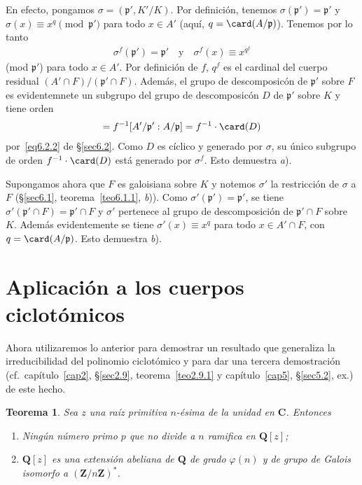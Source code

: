 \documentclass[bibtotoc,leqno,spanish]{amsbook}
\newcommand{\QQ}{\mathbf{Q}}
\newcommand{\ZZ}{\mathbf{Z}}
\newcommand{\CC}{\mathbf{C}}
\newcommand{\idl}[1]{\mathfrak{#1}}
\numberwithin{equation}{section}
\theoremstyle{note}
\theoremstyle{note}
\newtheorem{theorem}{Teorema}
\theoremstyle{rem}
\numberwithin{theorem}{section}
\numberwithin{proposition}{section}
\numberwithin{definition}{section}
\numberwithin{lemma}{section}
\numberwithin{corollary}{section}
\numberwithin{example}{section}
\numberwithin{footnote}{section}%
\begin{document}
En efecto, pongamos $\sigma = (\idl{p}',K'/K)$. Por definici\'on, tenemos $\sigma(\idl{p}')=\idl{p}'$ y
$\sigma(x) \equiv x^{q}\pmod{\idl{p}'}$ para todo $x\in A'$ (aqu\'i, $q = \card(A/\idl{p})$). Tenemos por lo tanto
\begin{gather*}
\sigma^{f}(\idl{p}') = \idl{p}'\quad\text{y}\quad\sigma^{f}(x)\equiv x^{q^{f}}
\end{gather*}
(mod $\idl{p}'$) para todo $x\in A'$. Por definici\'on de $f$, $q^{f}$ es el cardinal del cuerpo residual
$(A'\cap F)/(\idl{p}'\cap F)$. Adem\'as, el grupo de descomposic\'on de $\idl{p}'$ sobre $F$
es evidentemnete un subgrupo del grupo de descomposic\'on $D$ de $\idl{p}'$ sobre $K$ y tiene orden
\begin{gather*}
[A'/\idl{p}':(A'\cap F)/(\idl{p}'\cap F)] = f^{-1}[A'/\idl{p}':A/\idl{p}] = f^{-1}\cdot\card(D)
\end{gather*}
por~\eqref{eq6.2.2} de \S\ref{sec6.2}. Como $D$ es c\'iclico y generado por $\sigma$, su \'unico subgrupo de orden $f^{-1}\cdot\card(D)$
est\'a generado por $\sigma^{f}$. Esto demuestra {\itshape a}).

Supongamos ahora que $F$ es galoisiana sobre $K$ y notemos $\sigma'$ la restricci\'on de $\sigma$ a $F$
(\S\ref{sec6.1}, teorema~\ref{teo6.1.1}, {\itshape b})). Como $\sigma'(\idl{p}') = \idl{p}'$, se tiene $\sigma'(\idl{p}'\cap F)=\idl{p}'\cap F$
y $\sigma'$ pertenece al grupo de descomposici\'on de $\idl{p}'\cap F$ sobre $K$. Adem\'as evidentemente
se tiene $\sigma'(x)\equiv x^{q}$ para todo $x\in A'\cap F$, con $q = \card(A/\idl{p})$. Esto demuestra {\itshape b}).

\section{Aplicaci\'on a los cuerpos ciclot\'omicos}\label{sec6.4}

Ahora utilizaremos lo anterior para demostrar un resultado que generaliza la irreducibilidad del polinomio ciclot\'omico
y para dar una tercera demostraci\'on (cf.~cap\'itulo~\ref{cap2}, \S\ref{sec2.9}, teorema~\ref{teo2.9.1}
y cap\'itulo~\ref{cap5}, \S\ref{sec5.2}, ex.) de este hecho.

\begin{theorem}\label{teo6.4.1}
Sea $z$ una ra\'iz primitiva $n$-\'esima de la unidad en $\CC$. Entonces
\begin{enumerate}
\item Ning\'un n\'umero primo $p$ que no divide a $n$ ramifica en $\QQ[z]$;
\item $\QQ[z]$ es una extensi\'on abeliana de $\QQ$ de grado $\varphi(n)$ y de grupo de Galois isomorfo
a $(\ZZ/n\ZZ)^{*}$.
\end{enumerate}
\end{theorem}
\end{document}
